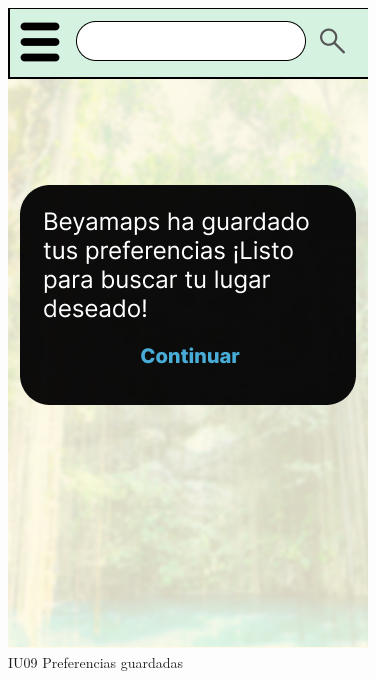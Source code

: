\begin{figure}[h]
    \begin{minipage}{0.5\textwidth}
        \centering
        \includegraphics[width=.7\linewidth]{Pantallas Prototipo3/IU09Preferencias del usuario.jpg}
        \caption{IU09 Preferencias guardadas}
    \end{minipage}
    

\end{figure}
